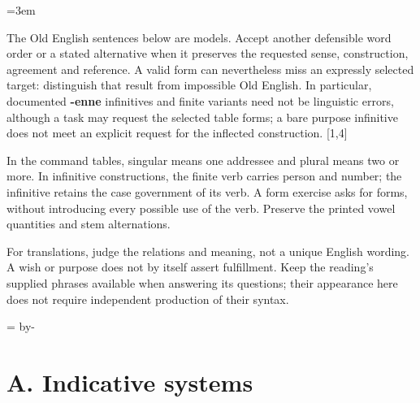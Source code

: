 \BookRecto
\begingroup
\renewcommand{\runningtitle}{Unit 6. Answer key}
\emergencystretch=3em
\newcommand{\itempara}[2]{\par\addvspace{3pt}\noindent\hangindent=1.8em\hangafter=1\makebox[1.8em][l]{#1.}#2\par}
\newcommand{\reserve}[1]{\par\penalty-100\begingroup\dimen0=\pagegoal\advance\dimen0 by-\pagetotal\ifdim\dimen0<#1\newpage\fi\endgroup}

\raggedright
{}

The Old English sentences below are models. Accept another defensible word order or a stated alternative when it preserves the requested sense, construction, agreement and reference. A valid form can nevertheless miss an expressly selected target: distinguish that result from impossible Old English. In particular, documented \textbf{-enne} infinitives and finite variants need not be linguistic errors, although a task may request the selected table forms; a bare purpose infinitive does not meet an explicit request for the inflected construction. [1,4]

In the command tables, singular means one addressee and plural means two or more. In infinitive constructions, the finite verb carries person and number; the infinitive retains the case government of its verb. A form exercise asks for forms, without introducing every possible use of the verb. Preserve the printed vowel quantities and stem alternations.

For translations, judge the relations and meaning, not a unique English wording. A wish or purpose does not by itself assert fulfillment. Keep the reading’s supplied phrases available when answering its questions; their appearance here does not require independent production of their syntax.

\reserve{7\baselineskip}
\section*{A. Indicative systems}

